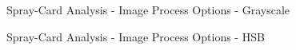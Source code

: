 \documentclass[10pt,letterpaper,titlepage]{article}
\begin{document}
    \begin{figure}[hb]
        \centering
        \caption{Spray-Card Analysis - Image Process Options - Grayscale}
        \label{fig:card_image_process_grayscale}
    \end{figure}
    \begin{figure}[hb]
        \centering
        \caption{Spray-Card Analysis - Image Process Options - HSB}
        \label{fig:card_image_process_hsb}
    \end{figure}
    \FloatBarrier
\end{document}
